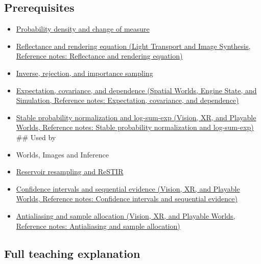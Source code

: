\subsection{Prerequisites}\label{appendix-031e02bf28af-prerequisites}

\begin{itemize}
\item
  \hyperref[appendix-4815cd87ab8b]{Probability density and change of measure}
\item
  \href{../04-Light-Transport-and-Image-Synthesis/main.pdf\#nameddest=appendix-96da0b153b77}{Reflectance and rendering equation (Light Transport and Image Synthesis, Reference notes: Reflectance and rendering equation)}
\item
  \hyperref[appendix-8d863ed954d0]{Inverse, rejection, and importance sampling}
\item
  \href{../05-Spatial-Worlds-Engine-State-and-Simulation/main.pdf\#nameddest=appendix-54c383df9992}{Expectation, covariance, and dependence (Spatial Worlds, Engine State, and Simulation, Reference notes: Expectation, covariance, and dependence)}
\item
  \href{../07-Vision-XR-and-Playable-Worlds/main.pdf\#nameddest=appendix-d580b422240f}{Stable probability normalization and log-sum-exp (Vision, XR, and Playable Worlds, Reference notes: Stable probability normalization and log-sum-exp)} \#\# Used by
\item
  {Worlds, Images and Inference}
\item
  \hyperref[appendix-68be451b78b1]{Reservoir resampling and ReSTIR}
\item
  \href{../07-Vision-XR-and-Playable-Worlds/main.pdf\#nameddest=appendix-c83016554b1e}{Confidence intervals and sequential evidence (Vision, XR, and Playable Worlds, Reference notes: Confidence intervals and sequential evidence)}
\item
  \href{../07-Vision-XR-and-Playable-Worlds/main.pdf\#nameddest=appendix-4192b2bdd21e}{Antialiasing and sample allocation (Vision, XR, and Playable Worlds, Reference notes: Antialiasing and sample allocation)}
\end{itemize}

\subsection{Full teaching explanation}\label{appendix-031e02bf28af-full-teaching-explanation}


